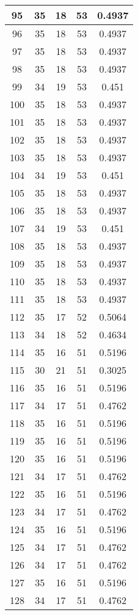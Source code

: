 \documentclass[letterpaper, 12pt]{article}
\begin{document}
\begin{longtable}{|c|c|c|c|c|}
\hline
95 & 35 & 18 & 53 & 0.4937 \\
\hline
96 & 35 & 18 & 53 & 0.4937 \\
\hline
97 & 35 & 18 & 53 & 0.4937 \\
\hline
98 & 35 & 18 & 53 & 0.4937 \\
\hline
99 & 34 & 19 & 53 & 0.451 \\
\hline
100 & 35 & 18 & 53 & 0.4937 \\
\hline
101 & 35 & 18 & 53 & 0.4937 \\
\hline
102 & 35 & 18 & 53 & 0.4937 \\
\hline
103 & 35 & 18 & 53 & 0.4937 \\
\hline
104 & 34 & 19 & 53 & 0.451 \\
\hline
105 & 35 & 18 & 53 & 0.4937 \\
\hline
106 & 35 & 18 & 53 & 0.4937 \\
\hline
107 & 34 & 19 & 53 & 0.451 \\
\hline
108 & 35 & 18 & 53 & 0.4937 \\
\hline
109 & 35 & 18 & 53 & 0.4937 \\
\hline
110 & 35 & 18 & 53 & 0.4937 \\
\hline
111 & 35 & 18 & 53 & 0.4937 \\
\hline
112 & 35 & 17 & 52 & 0.5064 \\
\hline
113 & 34 & 18 & 52 & 0.4634 \\
\hline
114 & 35 & 16 & 51 & 0.5196 \\
\hline
115 & 30 & 21 & 51 & 0.3025 \\
\hline
116 & 35 & 16 & 51 & 0.5196 \\
\hline
117 & 34 & 17 & 51 & 0.4762 \\
\hline
118 & 35 & 16 & 51 & 0.5196 \\
\hline
119 & 35 & 16 & 51 & 0.5196 \\
\hline
120 & 35 & 16 & 51 & 0.5196 \\
\hline
121 & 34 & 17 & 51 & 0.4762 \\
\hline
122 & 35 & 16 & 51 & 0.5196 \\
\hline
123 & 34 & 17 & 51 & 0.4762 \\
\hline
124 & 35 & 16 & 51 & 0.5196 \\
\hline
125 & 34 & 17 & 51 & 0.4762 \\
\hline
126 & 34 & 17 & 51 & 0.4762 \\
\hline
127 & 35 & 16 & 51 & 0.5196 \\
\hline
128 & 34 & 17 & 51 & 0.4762 \\

\end{longtable}
\end{document}
